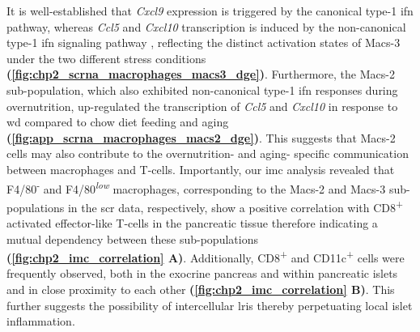 \par It is well-established that \textit{Cxcl9} expression is triggered by the canonical type-1 \gls{ifn} pathway, whereas \textit{Ccl5} and \textit{Cxcl10} transcription is induced by the non-canonical type-1 \gls{ifn} signaling pathway \textbf{\cite{mazewski_type_2020}}, reflecting the distinct activation states of Macs-3 under the two different stress conditions \textbf{(\autoref{fig:chp2_scrna_macrophages_macs3_dge})}. Furthermore, the Macs-2 sub-population, which also exhibited non-canonical type-1 \gls{ifn} responses during overnutrition, up-regulated the transcription of \textit{Ccl5} and \textit{Cxcl10} in response to \gls{wd} compared to chow diet feeding and aging \textbf{(\autoref{fig:app_scrna_macrophages_macs2_dge})}. This suggests that Macs-2 cells may also contribute to the overnutrition- and aging- specific communication between macrophages and T-cells. Importantly, our \gls{imc} analysis revealed that F4/80\textsuperscript{-} and F4/80\textsuperscript{\textit{low}} macrophages, corresponding to the Macs-2 and Macs-3 sub-populations in the \gls{scr} data, respectively, show a positive correlation with CD8\textsuperscript{+} activated effector-like T-cells in the pancreatic tissue therefore indicating a mutual dependency between these sub-populations \textbf{(\autoref{fig:chp2_imc_correlation} A)}. Additionally, CD8\textsuperscript{+} and CD11c\textsuperscript{+} cells were frequently observed, both in the exocrine pancreas and within pancreatic islets and in close proximity to each other \textbf{(\autoref{fig:chp2_imc_correlation} B)}. This further suggests the possibility of intercellular \gls{lri}s thereby perpetuating local islet inflammation.\\



